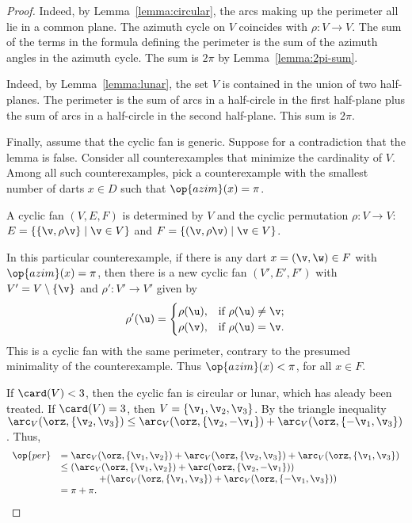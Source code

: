 \begin{proof} 
  Indeed, by Lemma~\ref{lemma:circular},
the arcs making up the perimeter all lie in a common plane.  The
azimuth cycle on $V$ coincides with $\rho:V\to V$.  The sum of the
terms in the formula defining the perimeter is the sum of the
azimuth angles in the azimuth cycle.  The sum is $2\pi$ by
Lemma~\ref{lemma:2pi-sum}.


  Indeed, by Lemma~\ref{lemma:lunar}, the
set $V$ is contained in the union of two half-planes.  The perimeter
is the sum of arcs in a half-circle in the first half-plane plus the
sum of arcs in a half-circle in the second half-plane. This sum is
$2\pi$.

Finally, assume that the cyclic fan is generic.  Suppose for a
contradiction that the lemma is false.  Consider all counterexamples
that minimize the cardinality of $V$.  Among all such
counterexamples, pick a counterexample with the smallest number of
darts $x\in D$ such that $\op{azim}(x) = \pi$.

A cyclic fan $(V,E,F)$ is determined by $V$ and the cyclic
permutation $\rho:V\to V$: $E=\{\{\v,\rho \v\}\mid \v\in V\}$ and $F
= \{(\v,\rho \v)\mid \v\in V\}$.

In this particular counterexample, if there is any dart
$x=(\v,\w)\in F$ with $\op{azim}(x)=\pi$, then there is a new cyclic
fan $(V',E',F')$ with $V' = V\setminus\{\v\}$ and $\rho':V'\to V'$
given by
\begin{displaymath}
\rho'(\u) = \begin{cases}
\rho(\u), & \text{if } \rho(\u)\ne \v;\\
\rho(\v), & \text{if }\rho(\u) = \v.\\
\end{cases}
\end{displaymath}
This is a cyclic fan with the same perimeter, contrary to the presumed
minimality of the counterexample.  Thus $\op{azim}(x) <\pi$, for all
$x\in F$.

If $\card(V) <3$, then the cyclic fan is circular or lunar, which has
aleady been treated.  If $\card(V)=3$, then $V=\{\v_1,\v_2,\v_3\}$.
By the triangle inequality $\arc_V(\orz,\{\v_2,\v_3\}) \le
\arc_V(\orz,\{\v_2,-\v_1\})+\arc_V(\orz,\{-\v_1,\v_3\})$.  Thus,
\begin{displaymath}
\begin{array}{rll}
  \op{per} &=\arc_V(\orz,\{\v_1,\v_2\}) 
  + \arc_V(\orz,\{\v_2,\v_3\}) 
  + \arc_V(\orz,\{\v_1,\v_3\})\\
  &\le(\arc_V(\orz,\{\v_1,\v_2\})+\arc(\orz,\{\v_2,-\v_1\}))
  \\&\qquad\qquad+(\arc_V(\orz,\{\v_1,\v_3\})
+\arc_V(\orz,\{-\v_1,\v_3\})) \\
  &= \pi+\pi.
\end{array}
\end{displaymath}


\end{proof}
